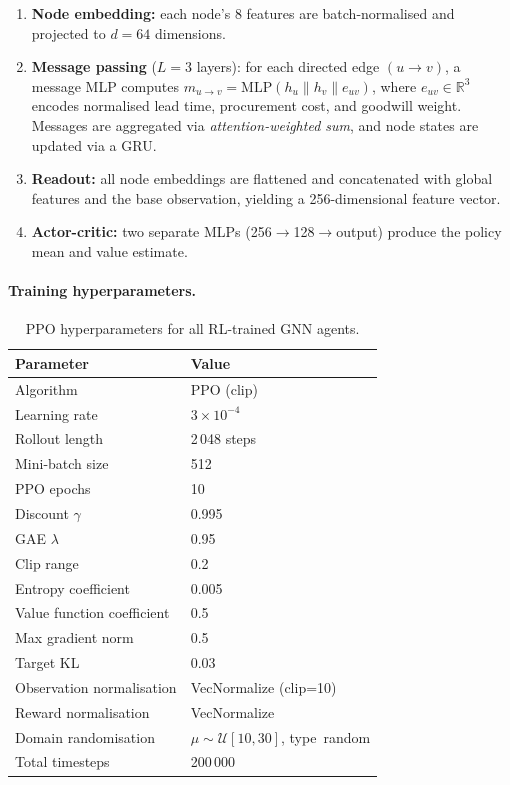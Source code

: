 \begin{enumerate}
  \item \textbf{Node embedding:} each node's 8 features are batch-normalised
        and projected to $d{=}64$ dimensions.
  \item \textbf{Message passing} ($L{=}3$ layers): for each directed edge
        $(u \to v)$, a message MLP computes
        $m_{u \to v} = \text{MLP}(h_u \| h_v \| e_{uv})$, where
        $e_{uv} \in \mathbb{R}^3$ encodes normalised lead time, procurement
        cost, and goodwill weight. Messages are aggregated via
        \emph{attention-weighted sum}, and node states are updated via a GRU.
  \item \textbf{Readout:} all node embeddings are flattened and
        concatenated with global features and the base observation, yielding
        a 256-dimensional feature vector.
  \item \textbf{Actor-critic:} two separate MLPs (256$\to$128$\to$output)
        produce the policy mean and value estimate.
\end{enumerate}

\paragraph{Training hyperparameters.}

\begin{table}[htbp]
\centering
\caption{PPO hyperparameters for all RL-trained GNN agents.}
\label{tab:ppo_hparams}
\small
\begin{tabular}{ll}
\toprule
\textbf{Parameter} & \textbf{Value} \\
\midrule
Algorithm & PPO (clip) \\
Learning rate & $3 \times 10^{-4}$ \\
Rollout length & 2\,048 steps \\
Mini-batch size & 512 \\
PPO epochs & 10 \\
Discount $\gamma$ & 0.995 \\
GAE $\lambda$ & 0.95 \\
Clip range & 0.2 \\
Entropy coefficient & 0.005 \\
Value function coefficient & 0.5 \\
Max gradient norm & 0.5 \\
Target KL & 0.03 \\
Observation normalisation & VecNormalize (clip=10) \\
Reward normalisation & VecNormalize \\
Domain randomisation & $\mu \sim \mathcal{U}[10, 30]$, type~random \\
Total timesteps & 200\,000 \\
\bottomrule
\end{tabular}
\end{table}

